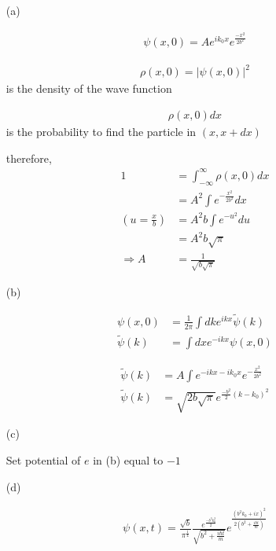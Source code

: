 \documentclass[11pt,a4paper]{article}
\begin{document}
\begin{enumerate}
\item[(a)]

\begin{align}
\psi(x,0)=Ae^{ik_0x}e^{\frac{-x^2}{2b^2}}
\end{align}

\begin{align}
\rho(x,0)=|\psi(x,0)|^2
\end{align}
is the density of the wave function

\begin{align}
\rho(x,0)dx
\end{align}
is the probability to find the particle in $(x,x+dx)$

therefore,
\begin{align}
1&=\int_{-\infty}^\infty\rho(x,0)dx\\
&=A^2\int e^{-\frac{x^2}{2b^2}}dx\\
(u=\frac{x}{b})&=A^2b\int e^{-u^2}du\\
&=A^2b\sqrt{\pi}\\
\Rightarrow A&=\frac{1}{\sqrt{b\sqrt{\pi}}}
\end{align}

\end{enumerate}

\begin{enumerate}
\item[(b)]

\begin{align}
\psi(x,0)&=\frac{1}{2\pi}\int dk e^{ikx}\tilde{\psi}(k)\\
\tilde{\psi}(k)&=\int dx e^{-ikx}\psi(x,0)
\end{align}

\begin{align}
\tilde{\psi}(k)&=A\int e^{-ikx-ik_0x}e^{-\frac{x^2}{2b^2}}\\
\tilde{\psi}(k)&=\sqrt{2b\sqrt{\pi}}e^{\frac{-b^2}{2}(k-k_0)^2}
\end{align}

\end{enumerate}

\begin{enumerate}
\item[(c)]

Set potential of $e$ in (b) equal to $-1$

\end{enumerate}

\begin{enumerate}
\item[(d)]

\begin{align}
\psi(x,t)=\frac{\sqrt{b}}{\pi^{\frac{1}{4}}}\frac{e^{\frac{-b^2k_0^2}{2}}}{\sqrt{b^2+\frac{i\hbar t}{m}}}e^{\frac{(b^2k_0+ix)^2}{2(b^2+\frac{i\hbar t}{m})}}
\end{align}

\end{enumerate}
\end{document}
